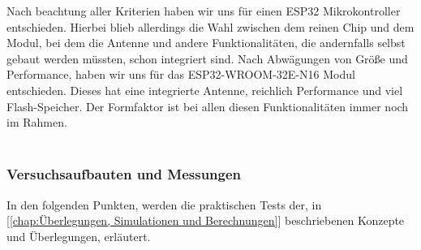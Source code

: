 \documentclass[titlepage,12pt,twoside]{article}
\begin{document}
Nach beachtung aller Kriterien haben wir uns für einen ESP32 Mikrokontroller entschieden. Hierbei blieb allerdings die Wahl zwischen
dem reinen Chip und dem Modul, bei dem die Antenne und andere Funktionalitäten, die andernfalls selbst gebaut werden müssten,
schon integriert sind. Nach Abwägungen von Größe und Performance, haben wir uns für das ESP32-WROOM-32E-N16 Modul entschieden.
Dieses hat eine integrierte Antenne, reichlich Performance und viel Flash-Speicher. Der Formfaktor ist bei allen diesen 
Funktionalitäten immer noch im Rahmen. \\
\\

\subsubsection{Versuchsaufbauten und Messungen}
In den folgenden Punkten, werden die praktischen Tests der, in [\textcolor{blue}{\autoref{chap:Überlegungen, Simulationen und Berechnungen}}] beschriebenen Konzepte und Überlegungen, erläutert.\\
\end{document}
